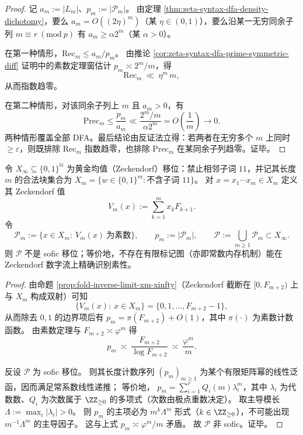 \begin{proof}
记 \(a_m:=|L_m|\)、\(p_m:=|\mathcal P_m|\)。
由定理 \ref{thm:zeta-syntax-dfa-density-dichotomy}，要么 \(a_m=O((2\eta)^m)\)（某 \(\eta\in(0,1)\)），要么沿某一无穷同余子列 \(m\equiv r\ (\mathrm{mod}\ p)\) 有 \(a_m\ge \alpha 2^m\)（某 \(\alpha>0\)）。
\par
在第一种情形，\(\mathrm{Rec}_m\le a_m/p_m\)。
由推论 \ref{cor:zeta-syntax-dfa-prime-symmetric-diff} 证明中的素数定理窗估计 \(p_m\asymp 2^m/m\)，得
\[
\mathrm{Rec}_m\ \ll\ \eta^m\,m,
\]
从而指数趋零。
\par
在第二种情形，对该同余子列上 \(m\) 且 \(a_m>0\)，有
\[
\mathrm{Prec}_m
\le \frac{p_m}{a_m}
\ll \frac{2^m/m}{\alpha 2^m}
=O\!\left(\frac{1}{m}\right)\to 0.
\]
两种情形覆盖全部 DFA。最后结论由反证法立得：若两者在无穷多个 \(m\) 上同时 \(\ge\varepsilon\)，则既排除 \(\mathrm{Rec}_m\) 指数趋零，也排除 \(\mathrm{Prec}_m\) 在某同余子列趋零。证毕。
\end{proof}

\begin{theorem}\label{thm:zeta-syntax-zeckendorf-primes-not-sofic}
令 \(X_\infty\subseteq\{0,1\}^{\mathbb N}\) 为黄金均值（Zeckendorf）移位：禁止相邻子词 \(11\)，并记其长度 \(m\) 的合法块集合为
\(
X_m=\{w\in\{0,1\}^m:\text{不含子词 }11\}
\)。
对 \(x=x_1\cdots x_m\in X_m\) 定义其 Zeckendorf 值
\[
V_m(x):=\sum_{k=1}^m x_k F_{k+1}.
\]
令
\[
\mathcal P_m:=\{x\in X_m:\ V_m(x)\ \text{为素数}\},
\qquad
p_m:=|\mathcal P_m|,
\qquad
\mathcal P:=\bigcup_{m\ge 1}\mathcal P_m\subset X_\infty.
\]
则 \(\mathcal P\) 不是 sofic 移位；等价地，不存在有限标记图（亦即常数内存机制）能在 Zeckendorf 数字流上精确识别素性。
\end{theorem}

\begin{proof}
由命题 \ref{prop:fold-inverse-limit-xm-xinfty}（Zeckendorf 截断在 \([0,F_{m+2})\) 上与 \(X_m\) 构成双射）可知
\[
\{V_m(x):\ x\in X_m\}=\{0,1,\dots,F_{m+2}-1\},
\]
从而除去 \(0,1\) 的边界项后有
\(
p_m=\pi(F_{m+2})+O(1)
\)，其中 \(\pi(\cdot)\) 为素数计数函数。
由素数定理与 \(F_{m+2}\asymp \varphi^m\) 得
\[
p_m\ \asymp\ \frac{F_{m+2}}{\log F_{m+2}}
\ \asymp\ \frac{\varphi^m}{m}.
\]
\par
反设 \(\mathcal P\) 为 sofic 移位。
则其长度计数序列 \((p_m)_{m\ge 1}\) 为某个有限矩阵幂的线性泛函，因而满足常系数线性递推；
等价地，
\(
p_m=\sum_{i=1}^r Q_i(m)\lambda_i^m
\)，其中 \(\lambda_i\) 为代数数、\(Q_i\) 为次数属于 \(\ZZ_{\ge 0}\) 的多项式（次数由极点重数决定）。
取主导模长 \(\Lambda:=\max_i|\lambda_i|>0\)。
则 \(p_m\) 的主项必为 \(m^k\Lambda^m\) 形式（\(k\in\ZZ_{\ge 0}\)），不可能出现 \(m^{-1}\Lambda^m\) 的主导因子。
这与上式 \(p_m\asymp \varphi^m/m\) 矛盾。
故 \(\mathcal P\) 非 sofic。证毕。
\end{proof}


